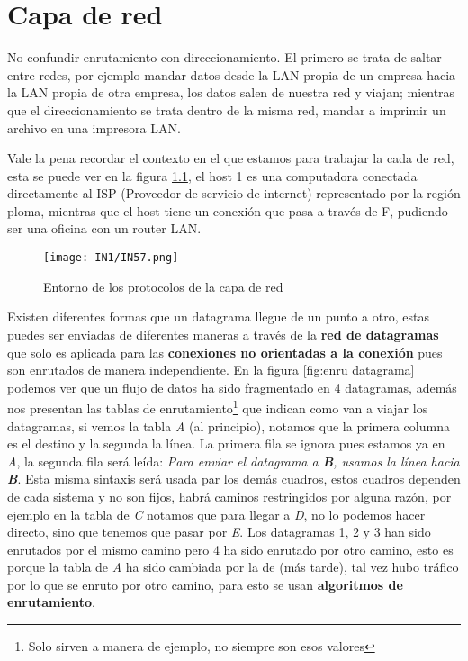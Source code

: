 \documentclass[
	12pt, %
	fleqn, %
	a4paper, %
	oneside, %
]{LegrandOrangeBook}
\begin{document}
\chapter{Capa de red}
\begin{remark}
No confundir enrutamiento con direccionamiento. El primero se trata de saltar entre redes, por ejemplo mandar datos desde la LAN propia de un empresa hacia la LAN propia de otra empresa, los datos salen de nuestra red y viajan; mientras que el direccionamiento se trata dentro de la misma red, mandar a imprimir un archivo en una impresora LAN.
\end{remark}
Vale la pena recordar el contexto en el que estamos para trabajar la cada de red, esta se puede ver en la figura \ref{fig:entorno red}, el host 1 es una computadora conectada directamente al ISP (Proveedor de servicio de internet) representado por la región ploma, mientras que el host tiene un conexión que pasa a través de F, pudiendo ser una oficina con un router LAN.
\begin{figure}[]
\centering
\texttt{[image: IN1/IN57.png]}
\caption{Entorno de los protocolos de la capa de red}
\label{fig:entorno red}
\end{figure}
Existen diferentes formas que un datagrama llegue de un punto a otro, estas puedes ser enviadas de diferentes maneras a través de la \textbf{red de datagramas} que solo es aplicada para las \textbf{conexiones no orientadas a la conexión} pues son enrutados de manera independiente. En la figura \ref{fig:enru datagrama} podemos ver que un flujo de datos ha sido fragmentado en 4 datagramas, además nos presentan las tablas de enrutamiento\footnote{Solo sirven a manera de ejemplo, no siempre son esos valores} que indican como van a viajar los datagramas, si vemos la tabla \textit{A} (al principio), notamos que la primera columna es el destino y la segunda la línea. La primera fila se ignora pues estamos ya en \textit{A}, la segunda fila será leída: \emph{Para enviar el datagrama a \textbf{\textit{B}}, usamos la línea hacia \textbf{\textit{B}}}. Esta misma sintaxis será usada par los demás cuadros, estos cuadros dependen de cada sistema y no son fijos, habrá caminos restringidos por alguna razón, por ejemplo en la tabla de \textit{C} notamos que para llegar a \textit{D}, no lo podemos hacer directo, sino que tenemos que pasar por \textit{E}. Los datagramas 1, 2 y 3 han sido enrutados por el mismo camino pero 4 ha sido enrutado por otro camino, esto es porque la tabla de \textit{A} ha sido cambiada por la de (más tarde), tal vez hubo tráfico por lo que se enruto por otro camino, para esto se usan \textbf{algoritmos de enrutamiento}.
\end{document}

